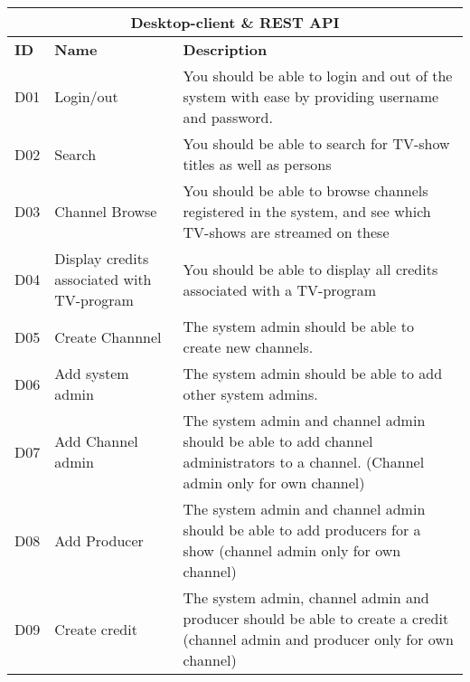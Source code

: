 \documentclass[a4paper,12pt]{article}
\begin{document}
\begin{longtable}{|p{1cm}|p{3.5cm}|p{11cm}|} 
    \hline
    
    
    \multicolumn{3}{|c|}{ \textbf{Desktop-client \& REST API}}  \\ 
    \hline
    \textbf{ID} & \textbf{Name} & \textbf{Description} \\
    \hline
    D01 & Login/out & You should be able to login and out of the system with ease by providing username and password. \\
    \hline
    D02 & Search & You should be able to search for TV-show titles as well as persons \\
    \hline
    D03 & Channel Browse & You should be able to browse channels registered in the system, and see which TV-shows are streamed on these \\
    \hline
    D04 & Display credits associated with TV-program & You should be able to display all credits associated with a TV-program \\
    \hline
    D05 & Create Channnel & The system admin should be able to create new channels. \\
    \hline
    D06 & Add system admin & The system admin should be able to add other system admins. \\
    \hline
    D07 & Add Channel admin & The system admin and channel admin should be able to add channel administrators to a channel. (Channel admin only for own channel) \\
    \hline
    D08 & Add Producer & The system admin and channel admin should be able to add producers for a show (channel admin only for own channel) \\
    \hline
    D09 & Create credit & The system admin, channel admin and producer should be able to create a credit (channel admin and producer only for own channel) \\

\end{longtable}
\end{document}
